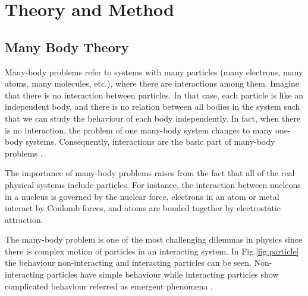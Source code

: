 \chapter{Theory and Method}

\section{Many Body Theory}


Many-body problems refer to systems
with many particles (many electrons, many atoms, many molecules, etc.), where there are interactions among them. Imagine that there is no interaction between particles. In that case, each particle is like an independent body, and there is no relation between all bodies in the system such that we can study the behaviour of each body independently. In fact, when there is no interaction, the problem of one many-body system changes to many one-body systems. Consequently, interactions are the basic part of many-body problems \cite{Richard}.

The importance of many-body problems raises from the fact that all of the real physical systems include particles. For instance, the interaction between nucleons in a nucleus is governed by the nuclear force, electrons in an atom or metal interact by Coulomb forces, and atoms are bonded together by electrostatic attraction. 




The many-body problem is one of the most challenging dilemmas in physics since there is complex motion of particles in an interacting system. In Fig.\ref{fig:particle} the behaviour non-interacting and interacting particles can be seen. Non-interacting particles have simple behaviour while interacting particles show complicated behaviour referred as emergent phenomena \cite{Eva}.


